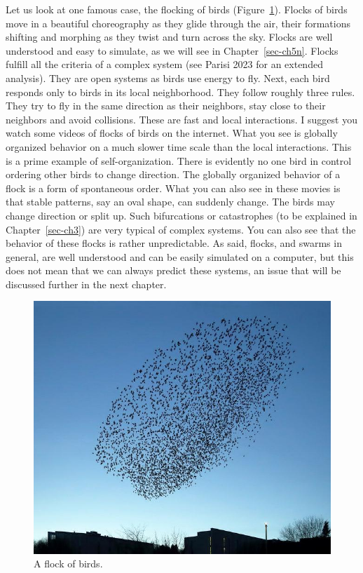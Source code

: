 \documentclass[
  a4paper,
  DIV=11,
  numbers=noendperiod]{scrreprt}
\begin{document}
Let us look at one famous case, the flocking of birds
(Figure~\ref{fig-ch1-img1}). Flocks of birds move in a beautiful
choreography as they glide through the air, their formations shifting
and morphing as they twist and turn across the sky. Flocks are well
understood and easy to simulate, as we will see in
Chapter~\ref{sec-ch5n}. Flocks fulfill all the criteria of a complex
system (see Parisi 2023 for an extended analysis). They are open systems
as birds use energy to fly. Next, each bird responds only to birds in
its local neighborhood. They follow roughly three rules. They try to fly
in the same direction as their neighbors, stay close to their neighbors
and avoid collisions. These are fast and local interactions. I suggest
you watch some videos of flocks of birds on the internet. What you see
is globally organized behavior on a much slower time scale than the
local interactions. This is a prime example of self-organization. There
is evidently no one bird in control ordering other birds to change
direction. The globally organized behavior of a flock is a form of
spontaneous order. What you can also see in these movies is that stable
patterns, say an oval shape, can suddenly change. The birds may change
direction or split up. Such bifurcations or catastrophes (to be
explained in Chapter~\ref{sec-ch3}) are very typical of complex systems.
You can also see that the behavior of these flocks is rather
unpredictable. As said, flocks, and swarms in general, are well
understood and can be easily simulated on a computer, but this does not
mean that we can always predict these systems, an issue that will be
discussed further in the next chapter.

\begin{figure}

{\centering \includegraphics{media/ch1/image1.jpg}

}

\caption{\label{fig-ch1-img1}A flock of birds.}

\end{figure}
\end{document}
